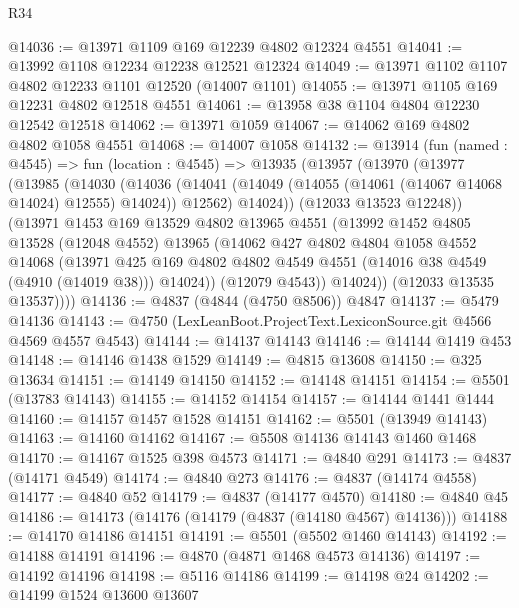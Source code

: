 \begin{lexlean}{R34}
\begin{coremodule}
@14036 := @13971 @1109 @169 @12239 @4802 @12324 @4551
@14041 := @13992 @1108 @12234 @12238 @12521 @12324
@14049 := @13971 @1102 @1107 @4802 @12233 @1101 @12520 (@14007 @1101)
@14055 := @13971 @1105 @169 @12231 @4802 @12518 @4551
@14061 := @13958 @38 @1104 @4804 @12230 @12542 @12518
@14062 := @13971 @1059
@14067 := @14062 @169 @4802 @4802 @1058 @4551
@14068 := @14007 @1058
@14132 := @13914
    (fun (named : @4545) =>
    fun (location : @4545) =>
    @13935
      (@13957
        (@13970
          (@13977
            (@13985
              (@14030
                (@14036
                  (@14041 (@14049 (@14055 (@14061 (@14067 @14068 @14024) @12555) @14024)) @12562)
                  @14024))
              (@12033 @13523 @12248))
            (@13971
              @1453
              @169
              @13529
              @4802
              @13965
              @4551
              (@13992
                @1452
                @4805
                @13528
                (@12048 @4552)
                @13965
                (@14062
                  @427
                  @4802
                  @4804
                  @1058
                  @4552
                  @14068
                  (@13971
                    @425
                    @169
                    @4802
                    @4802
                    @4549
                    @4551
                    (@14016 @38 @4549 (@4910 (@14019 @38)))
                    @14024))
                (@12079 @4543))
              @14024))
          (@12033 @13535 @13537))))
@14136 := @4837 (@4844 (@4750 @8506)) @4847
@14137 := @5479 @14136
@14143 := @4750 (LexLeanBoot.ProjectText.LexiconSource.git @4566 @4569 @4557 @4543)
@14144 := @14137 @14143
@14146 := @14144 @1419 @453
@14148 := @14146 @1438 @1529
@14149 := @4815 @13608
@14150 := @325 @13634
@14151 := @14149 @14150
@14152 := @14148 @14151
@14154 := @5501 (@13783 @14143)
@14155 := @14152 @14154
@14157 := @14144 @1441 @1444
@14160 := @14157 @1457 @1528 @14151
@14162 := @5501 (@13949 @14143)
@14163 := @14160 @14162
@14167 := @5508 @14136 @14143 @1460 @1468
@14170 := @14167 @1525 @398 @4573
@14171 := @4840 @291
@14173 := @4837 (@14171 @4549)
@14174 := @4840 @273
@14176 := @4837 (@14174 @4558)
@14177 := @4840 @52
@14179 := @4837 (@14177 @4570)
@14180 := @4840 @45
@14186 := @14173 (@14176 (@14179 (@4837 (@14180 @4567) @14136)))
@14188 := @14170 @14186 @14151
@14191 := @5501 (@5502 @1460 @14143)
@14192 := @14188 @14191
@14196 := @4870 (@4871 @1468 @4573 @14136)
@14197 := @14192 @14196
@14198 := @5116 @14186
@14199 := @14198 @24
@14202 := @14199 @1524 @13600 @13607

\end{coremodule}
\end{lexlean}
